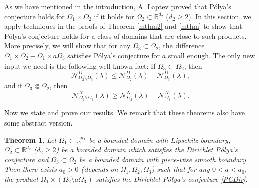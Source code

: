 \documentclass[11pt,letterpaper]{amsart}
\numberwithin{equation}{section}
\theoremstyle{plain}
\newtheorem{theorem}{Theorem}[section]
\theoremstyle{plain}
\numberwithin{equation}{section}
\theoremstyle{remark}
\begin{document}
As we have mentioned in the introduction, A. Laptev \cite{AL} proved that P\'olya's conjecture holds for $\Omega_1 \times \Omega_2$ if it holds for $\Omega_2 \subset \mathbb R^{d_2}$ ($d_2 \ge 2$). In this section, we apply techniques in the proofs of Theorem \ref{mthm2} and \ref{mthm} to show that P\'olya's conjecture holds for a class of domains that are close to such products. More precisely, we will show that for any  $\Omega_3 \subset \Omega_2$, the difference $\Omega_1 \times \Omega_2 -\Omega_1 \times a\Omega_3$  satisfies P\'olya's conjecture for $a$ small enough. The only new input we need is the following well-known fact: If $\Omega_3 \subset \Omega_2$, then 	
\[\mathcal N^D_{\Omega_2\setminus\Omega_3}(\lambda)\leq \mathcal N^D_{\Omega_2}(\lambda)- \mathcal N^D_{\Omega_3}(\lambda),\] 
and if $\Omega_3 \Subset \Omega_2$, then 
\[\mathcal N^N_{\Omega_2\setminus \Omega_3}(\lambda)\ge \mathcal N^N_{\Omega_2}(\lambda)- \mathcal N^N_{\Omega_3}(\lambda).\]

Now we state and prove our results. We remark that these theorems also have some abstract version. 
\begin{theorem}\label{speDiri}
	Let $\Omega_1\subset \mathbb R^{d_1}$ be a bounded domain with Lipschitz boundary, $\Omega_2\subset \mathbb R^{d_2}$ ($d_2 \ge 2$) be a bounded domain which satisfies the Dirichlet P\'olya's conjecture and $\Omega_3\subset \Omega_2$ be a bounded domain with piece-wise smooth boundary. Then there exists $a_0>0$ (depends on $\Omega_1,\Omega_2,\Omega_3$) such that for any $0<a<a_0$, the product $\Omega_1\times (\Omega_2\setminus a\Omega_3)$ satisfies the Dirichlet P\'olya's conjecture \eqref{PCDir}.
\end{theorem}
\end{document}
